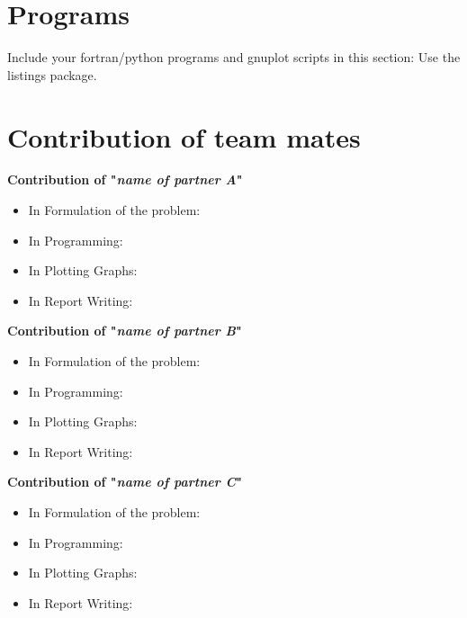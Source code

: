 \documentclass[12pt]{article}
\begin{document}

\newpage 
\appendix
\section{Programs}
Include your fortran/python programs and gnuplot scripts in this section: 
Use the listings package.
\newpage 
\section{Contribution of team mates}
\large{\bf {Contribution of "{\it name of partner A}"}}
\begin{itemize}
   \item In Formulation of the problem:  
   \item  In Programming: 
   \item  In Plotting Graphs:
   \item  In Report Writing: 
\end{itemize}
\large{\bf {Contribution of "{\it name of partner B}"}}
\begin{itemize}
   \item In Formulation of the problem:  
   \item  In Programming: 
   \item  In Plotting Graphs:
   \item  In Report Writing:
\end{itemize}
\large{\bf {Contribution of "{\it name of partner C}"}}
\begin{itemize}
   \item In Formulation of the problem:  
   \item  In Programming: 
   \item  In Plotting Graphs:
   \item  In Report Writing: 
\end{itemize}

\end{document}

